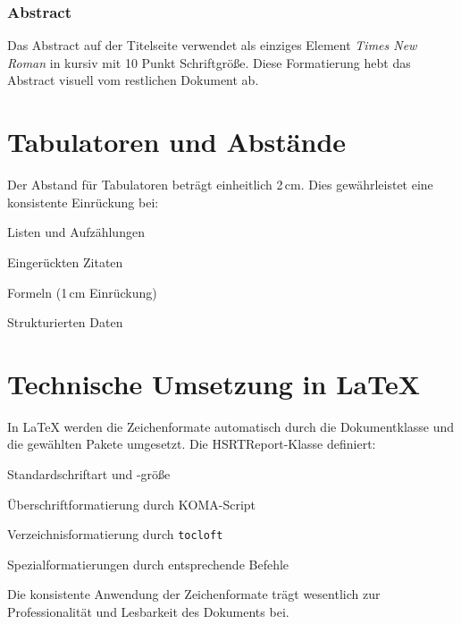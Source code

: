 \subsubsection{Abstract}
Das Abstract auf der Titelseite verwendet als einziges Element \emph{Times New Roman} in kursiv mit 10 Punkt Schriftgröße. Diese Formatierung hebt das Abstract visuell vom restlichen Dokument ab.

\section{Tabulatoren und Abstände}
\label{sec:tabulatoren}

Der Abstand für Tabulatoren beträgt einheitlich 2\,cm. Dies gewährleistet eine konsistente Einrückung bei:
\begin{listenabsatz}
	\item Listen und Aufzählungen
	\item Eingerückten Zitaten
	\item Formeln (1\,cm Einrückung)
	\item Strukturierten Daten
\end{listenabsatz}

\section{Technische Umsetzung in \LaTeX}
\label{sec:technische_umsetzung}

In \LaTeX{} werden die Zeichenformate automatisch durch die Dokumentklasse und die gewählten Pakete umgesetzt. Die HSRTReport-Klasse definiert:
\begin{listenabsatz}
	\item Standardschriftart und -größe
	\item Überschriftformatierung durch KOMA-Script
	\item Verzeichnisformatierung durch \texttt{tocloft}
	\item Spezialformatierungen durch entsprechende Befehle
\end{listenabsatz}

Die konsistente Anwendung der Zeichenformate trägt wesentlich zur Professionalität und Lesbarkeit des Dokuments bei.

